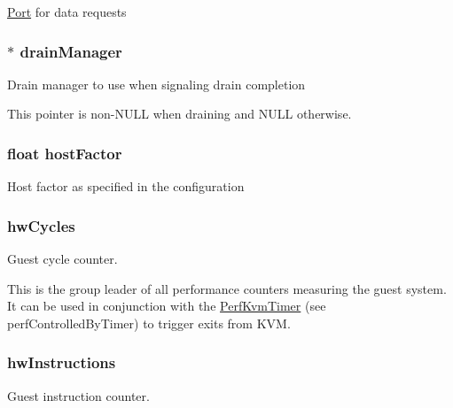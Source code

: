 \hyperlink{classPort}{Port} for data requests \hypertarget{classBaseKvmCPU_a329b71fb934a93312ca0aacbf5a3f982}{
\subsubsection[{drainManager}]{$\ast$ {\bf drainManager}}}
\label{classBaseKvmCPU_a329b71fb934a93312ca0aacbf5a3f982}
Drain manager to use when signaling drain completion

This pointer is non-\/NULL when draining and NULL otherwise. \hypertarget{classBaseKvmCPU_a0ef366aa4bbbcdc2f7eeb7fcd3962dde}{
\subsubsection[{hostFactor}]{\setlength{\rightskip}{0pt plus 5cm}float {\bf hostFactor}}}
\label{classBaseKvmCPU_a0ef366aa4bbbcdc2f7eeb7fcd3962dde}
Host factor as specified in the configuration \hypertarget{classBaseKvmCPU_a496c1c0ab30aeafdeeeede34db1edf45}{
\subsubsection[{hwCycles}]{ {\bf hwCycles}}}
\label{classBaseKvmCPU_a496c1c0ab30aeafdeeeede34db1edf45}
Guest cycle counter.

This is the group leader of all performance counters measuring the guest system. It can be used in conjunction with the \hyperlink{classPerfKvmTimer}{PerfKvmTimer} (see perfControlledByTimer) to trigger exits from KVM. \hypertarget{classBaseKvmCPU_ab3360069d449c748e7b9efe5f6d427e9}{
\subsubsection[{hwInstructions}]{ {\bf hwInstructions}}}
\label{classBaseKvmCPU_ab3360069d449c748e7b9efe5f6d427e9}
Guest instruction counter.


